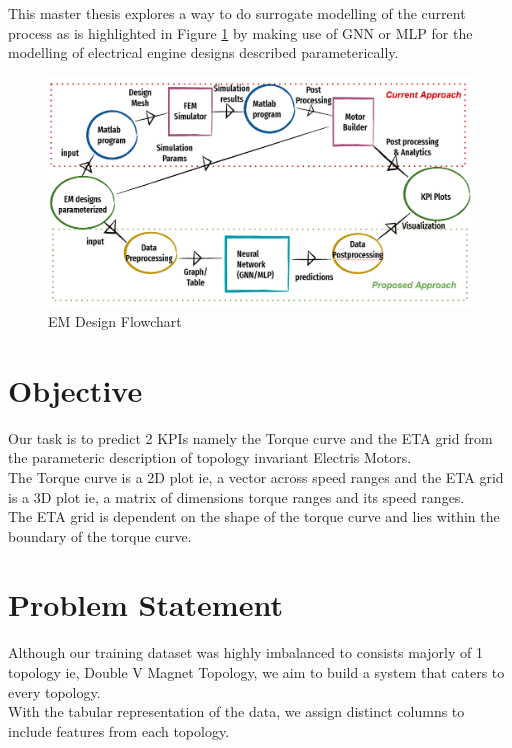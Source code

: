 \documentclass{report} %
\begin{document}
This master thesis explores a way to do surrogate modelling of the current process as is highlighted in Figure \ref{fig:EM Design Flowchart} by making use of \ac{GNN} or \ac{MLP} for the modelling of electrical engine designs described parameterically. \\
\begin{figure}[H]
    \centering
    \includegraphics[width=1\textwidth]{./ReportImages/EM_design_flowchart_v2.png} 
    \caption{EM Design Flowchart}
    \label{fig:EM Design Flowchart}
\end{figure}


\section{Objective}\label{sec:Objective}
Our task is to predict 2 KPIs namely the Torque curve and the ETA grid from the parameteric description of topology invariant Electris Motors. \\
The Torque curve is a 2D plot ie, a vector across speed ranges and the ETA grid is a 3D plot ie, a matrix of dimensions torque ranges and its speed ranges. \\
The ETA grid is dependent on the shape of the torque curve and lies within the boundary of the torque curve.\\

\section{Problem Statement}\label{sec:Problem Statement}

Although our training dataset was highly imbalanced to consists majorly of 1 topology ie, Double V Magnet Topology, we aim to build a system that caters to every topology. \\
With the tabular representation of the data, we assign distinct columns to include features from each topology.
\end{document}
